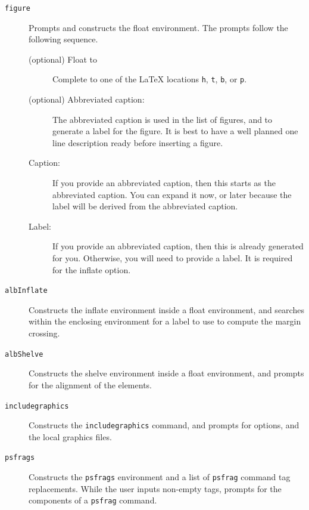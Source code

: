 \documentclass[11pt,a4paper,oneside,titlepage]{alb-latex}
\begin{document}
\begin{description}
\item[\texttt{figure}] Prompts and constructs the float environment.
  The prompts follow the following sequence.

  \begin{description}
  \item[(optional) Float to] Complete to one of the \LaTeX{} locations
    \texttt{h}, \texttt{t}, \texttt{b}, or \texttt{p}.

  \item[(optional) Abbreviated caption:] The abbreviated caption is used
    in the list of figures, and to generate a label for the figure.  It
    is best to have a well planned one line description ready before
    inserting a figure.

  \item[Caption:] If you provide an abbreviated caption, then this
    starts as the abbreviated caption.  You can expand it now, or later
    because the label will be derived from the abbreviated caption.

  \item[Label:] If you provide an abbreviated caption, then this is
    already generated for you.  Otherwise, you will need to provide a
    label.  It is required for the inflate option.
  \end{description}

\item[\texttt{albInflate}] Constructs the inflate environment inside a
  float environment, and searches within the enclosing environment for a
  label to use to compute the margin crossing.

\item[\texttt{albShelve}] Constructs the shelve environment inside a
  float environment, and prompts for the alignment of the elements.

\item[\texttt{includegraphics}] Constructs the \texttt{includegraphics}
  command, and prompts for options, and the local graphics files.

\item[\texttt{psfrags}] Constructs the \texttt{psfrags} environment and
  a list of \texttt{psfrag} command tag replacements.  While the user
  inputs non-empty tags, \AUCTeX{} prompts for the components of a
  \texttt{psfrag} command.
\end{description}



\end{document}
